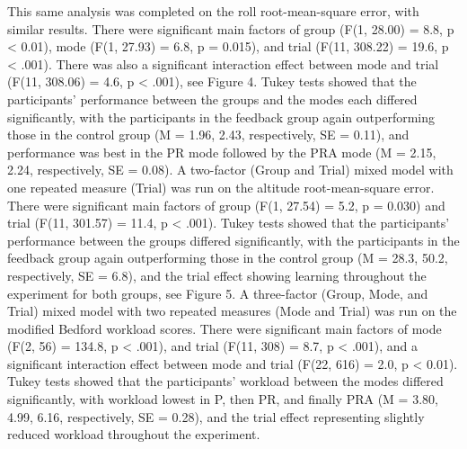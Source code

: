 This same analysis was completed on the roll root-mean-square error, with similar results.
There were significant main factors of group (F(1, 28.00) = 8.8, p < 0.01), mode (F(1, 27.93) = 6.8, p = 0.015), and trial (F(11, 308.22) = 19.6, p < .001).
There was also a significant interaction effect between mode and trial (F(11, 308.06) = 4.6, p < .001), see Figure 4.
Tukey tests showed that the participants' performance between the groups and the modes each differed significantly, with the participants in the feedback group again outperforming those in the control group (M = 1.96, 2.43, respectively, SE = 0.11), and performance was best in the PR mode followed by the PRA mode (M = 2.15, 2.24, respectively, SE = 0.08).
A two-factor (Group and Trial) mixed model with one repeated measure (Trial) was run on the altitude root-mean-square error.
There were significant main factors of group (F(1, 27.54) = 5.2, p = 0.030) and trial (F(11, 301.57) = 11.4, p < .001).
Tukey tests showed that the participants' performance between the groups differed significantly, with the participants in the feedback group again outperforming those in the control group (M = 28.3, 50.2, respectively, SE = 6.8), and the trial effect showing learning throughout the experiment for both groups, see Figure 5.
A three-factor (Group, Mode, and Trial) mixed model with two repeated measures (Mode and Trial) was run on the modified Bedford workload scores.
There were significant main factors of mode (F(2, 56) = 134.8, p < .001), and trial (F(11, 308) = 8.7, p < .001), and a significant interaction effect between mode and trial (F(22, 616) = 2.0, p < 0.01).
Tukey tests showed that the participants' workload between the modes differed significantly, with workload lowest in P, then PR, and finally PRA (M = 3.80, 4.99, 6.16, respectively, SE = 0.28), and the trial effect representing slightly reduced workload throughout the experiment.

